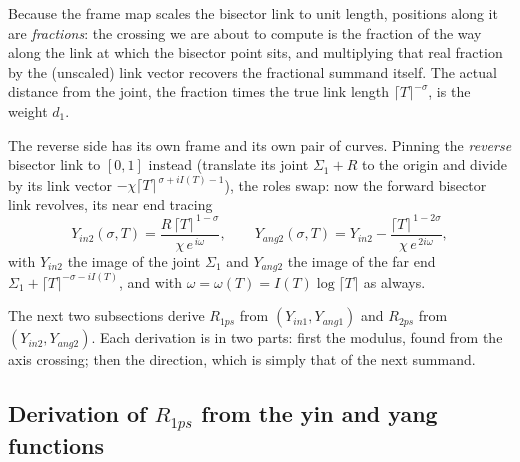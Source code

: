\documentclass[11pt]{article}
\theoremstyle{definition}
\begin{document}
Because the frame map scales the bisector link to unit length, positions along
it are \emph{fractions}: the crossing we are about to compute is the fraction
of the way along the link at which the bisector point sits, and multiplying
that real fraction by the (unscaled) link vector recovers the fractional
summand itself. The actual distance from the joint, the fraction times the
true link length $\lceil T\rceil^{-\sigma}$, is the weight $d_1$.

The reverse side has its own frame and its own pair of curves. Pinning the
\emph{reverse} bisector link to $[0,1]$ instead (translate its joint
$\Sigma_1+R$ to the origin and divide by its link vector
$-\chi\lceil T\rceil^{\,\sigma+iI(T)-1}$), the roles swap: now the forward
bisector link revolves, its near end tracing
\begin{equation}\label{eq:yin2yang2}
Y_{in2}(\sigma,T)=\frac{R\,\lceil T\rceil^{\,1-\sigma}}{\chi\,e^{\,i\omega}},
\qquad
Y_{ang2}(\sigma,T)=Y_{in2}-\frac{\lceil T\rceil^{\,1-2\sigma}}{\chi\,e^{\,2i\omega}},
\end{equation}
with $Y_{in2}$ the image of the joint $\Sigma_1$ and $Y_{ang2}$ the image of
the far end $\Sigma_1+\lceil T\rceil^{-\sigma-iI(T)}$, and with
$\omega=\omega(T)=I(T)\log\lceil T\rceil$ as always.

The next two subsections derive $R_{1ps}$ from $(Y_{in1},Y_{ang1})$ and
$R_{2ps}$ from $(Y_{in2},Y_{ang2})$. Each derivation is in two parts: first
the modulus, found from the axis crossing; then the direction, which is simply
that of the next summand.

\subsection{Derivation of \texorpdfstring{$R_{1ps}$}{R1ps} from the yin and yang functions}\label{sec:derive-r1ps}
\end{document}
